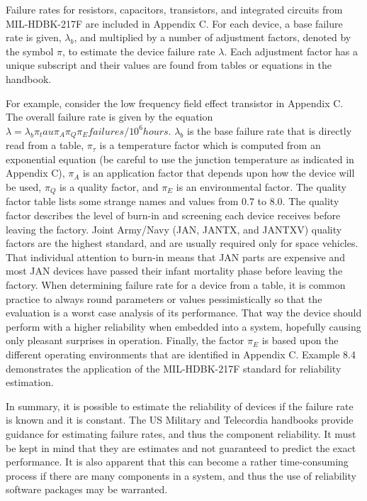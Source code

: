 Failure rates for resistors, capacitors, transistors, and integrated
circuits from MIL-HDBK-217F are included in Appendix C. For each device,
a base failure rate is given, $\lambda_b$, and multiplied
by a number of adjustment factors, denoted by the symbol
$\pi$, to estimate the device failure
rate $\lambda$. Each adjustment factor has a unique subscript and their
values are found from tables or equations in the handbook.

For example, consider the low frequency field effect transistor in
Appendix C. The overall failure rate is given by the equation
$\lambda=\lambda_b \pi_tau \pi_A \pi_Q \pi_E failures /10^6 hours$.
$\lambda_b$  is the base failure rate that is directly read from a table, 
 $\pi_\tau$ is a temperature factor which is computed from an 
 exponential equation (be careful to use the junction temperature 
 as indicated in Appendix C),
$\pi_A$ is an application factor that depends upon how the device 
will be used, $\pi_Q$ is a quality factor, and $\pi_E$ is an 
environmental factor. The
quality factor table lists some strange names and values from 0.7 to
8.0. The quality factor describes the level of burn-in and screening
each device receives before leaving the factory. Joint Army/Navy (JAN,
JANTX, and JANTXV) quality factors are the highest standard, and are
usually required only for space vehicles. That individual attention to
burn-in means that JAN parts are expensive and most JAN devices have
passed their infant mortality phase before leaving the factory. When
determining failure rate for a device from a table, it is common
practice to always round parameters or values pessimistically so that
the evaluation is a worst case analysis of its performance. That way the
device should perform with a higher reliability when embedded into a
system, hopefully causing only pleasant surprises in operation. Finally,
the factor $\pi_E$ is based upon the
different operating environments that are identified in Appendix C.
Example 8.4 demonstrates the application of the MIL-HDBK-217F standard
for reliability estimation.

In summary, it is possible to estimate the reliability of devices if the
failure rate is known and it is constant. The US Military and Telecordia
handbooks provide guidance for estimating failure rates, and thus the
component reliability. It must be kept in mind that they are estimates
and not guaranteed to predict the exact performance. It is also apparent
that this can become a rather time-consuming process if there are many
components in a system, and thus the use of reliability software
packages may be warranted.

